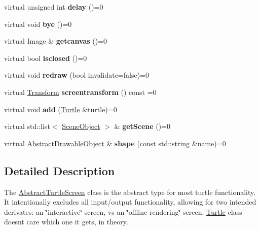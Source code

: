 \begin{DoxyCompactItemize}
virtual unsigned int {\bfseries delay} ()=0
\item 
\mbox{\label{classcturtle_1_1AbstractTurtleScreen_a04de9abc6c3a8f046568c7d1a842d168}} 
virtual void {\bfseries bye} ()=0
\item 
\mbox{\label{classcturtle_1_1AbstractTurtleScreen_a090a77eb87eab4a3d3e4f1b9476abff2}} 
virtual Image \& {\bfseries getcanvas} ()=0
\item 
\mbox{\label{classcturtle_1_1AbstractTurtleScreen_a5a68db439eb8e5016a290529d62610f5}} 
virtual bool {\bfseries isclosed} ()=0
\item 
\mbox{\label{classcturtle_1_1AbstractTurtleScreen_a6bf8b7618ccd22087cc4fcb95d9e2ac5}} 
virtual void {\bfseries redraw} (bool invalidate=false)=0
\item 
\mbox{\label{classcturtle_1_1AbstractTurtleScreen_a602b6058a1d56e27700155987b791056}} 
virtual \hyperlink{classcturtle_1_1Transform}{Transform} {\bfseries screentransform} () const =0
\item 
\mbox{\label{classcturtle_1_1AbstractTurtleScreen_aa82ae80751e1f6f71b07d2c0ba72e5e8}} 
virtual void {\bfseries add} (\hyperlink{classcturtle_1_1Turtle}{Turtle} \&turtle)=0
\item 
\mbox{\label{classcturtle_1_1AbstractTurtleScreen_ab4524119329c3ab3ce2a9a864ec87437}} 
virtual std\+::list$<$ \hyperlink{structcturtle_1_1SceneObject}{Scene\+Object} $>$ \& {\bfseries get\+Scene} ()=0
\item 
\mbox{\label{classcturtle_1_1AbstractTurtleScreen_a63ad1c2ec491e0a8773fc53aac0b9c3a}} 
virtual \hyperlink{classcturtle_1_1AbstractDrawableObject}{Abstract\+Drawable\+Object} \& {\bfseries shape} (const std\+::string \&name)=0
\end{DoxyCompactItemize}


\subsection{Detailed Description}
The \hyperlink{classcturtle_1_1AbstractTurtleScreen}{Abstract\+Turtle\+Screen} class is the abstract type for most turtle functionality. It intentionally excludes all input/output functionality, allowing for two intended derivates\+: an \char`\"{}interactive\char`\"{} screen, vs an \char`\"{}offline rendering\char`\"{} screen. \hyperlink{classcturtle_1_1Turtle}{Turtle} class doesn\textquotesingle{}t care which one it gets, in theory. 

